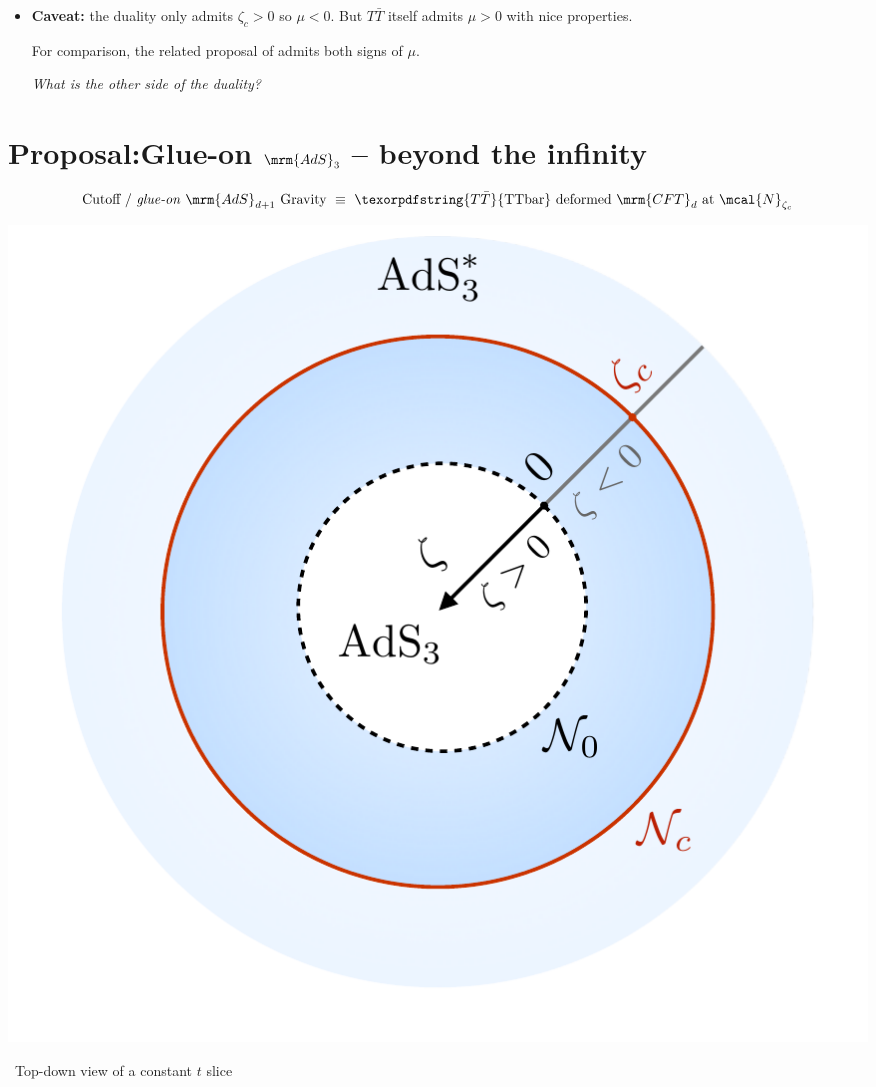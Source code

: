 \documentclass[10pt]{article}
\newcommand{\TTbar}{\texorpdfstring{\ensuremath{T\bar{T}}}{TTbar}\xspace}
\begin{document}
\begin{multicols}{3}
\begin{itemize}
\item \textbf{Caveat:} the duality only admits $\zeta_c > 0$ so $\mu < 0$.
But \TTbar itself admits $\mu > 0$ with nice properties.

For comparison, the related proposal of \textcite{Guica:2019nzm} admits both signs of $\mu$.

\textit{What is the other side of the duality?}

\end{itemize}

\section*{\textbf{Proposal:}\texstringonly{\\}Glue-on $\mrm{AdS}_3$ -- beyond the infinity}
\label{se:glueonproposal}

\parbox{\linewidth}{
\vspace{-\baselineskip}
\begin{equation*}
	\textrm{Cutoff / \textit{glue-on} $\mrm{AdS}_{d+1}$ Gravity}
	\ \equiv\ %
	\textrm{\TTbar deformed $\mrm{CFT}_{d}$ at $\mcal{N}_{\zeta_c}$}
\end{equation*}
\begin{center}
	\vspace{-.8\baselineskip}%
	\centering
	\includegraphics[width=.6\linewidth]{img/diagram.pdf}
	
	\vspace{-.5\baselineskip}
	\scriptsize\ Top-down view of a constant $t$ slice
\end{center}
}

\begin{itemize}


\end{itemize}
\end{multicols}
\end{document}
